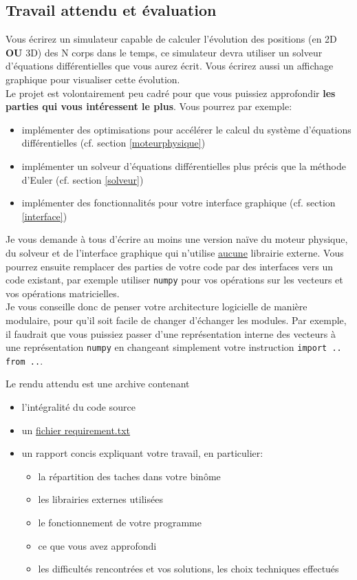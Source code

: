 \documentclass{article}
\begin{document}
\subsection{Travail attendu et évaluation}

Vous écrirez un simulateur capable de calculer l'évolution des positions (en 2D \textbf{OU} 3D) des N corps dans le temps, ce simulateur devra utiliser un solveur d'équations différentielles que vous aurez écrit. Vous écrirez aussi un affichage graphique pour visualiser cette évolution. \\
Le projet est volontairement peu cadré pour que vous puissiez approfondir \textbf{les parties qui vous intéressent le plus}. Vous pourrez par exemple:
\begin{itemize}
    \item implémenter des optimisations pour accélérer le calcul du système d'équations différentielles (cf. section \ref{moteurphysique})
    \item implémenter un solveur d'équations différentielles plus précis que la méthode d'Euler (cf. section \ref{solveur})
    \item implémenter des fonctionnalités pour votre interface graphique (cf. section \ref{interface})
\end{itemize}
Je vous demande à tous d'écrire au moins une version naïve du moteur physique, du solveur et de l'interface graphique qui n'utilise \underline{aucune} librairie externe. Vous pourrez ensuite remplacer des parties de votre code par des interfaces vers un code existant, par exemple utiliser \verb!numpy! pour vos opérations sur les vecteurs et vos opérations matricielles.\\
Je vous conseille donc de penser votre architecture logicielle de manière modulaire, pour qu'il soit facile de changer d'échanger les modules. Par exemple, il faudrait que vous puissiez passer d'une représentation interne des vecteurs à une représentation \verb!numpy! en changeant simplement votre instruction \verb!import .. from ..!.

\vspace{1em}

\noindent Le rendu attendu est une archive contenant
\begin{itemize}
    \item l'intégralité du code source
    \item un \href{https://pip.pypa.io/en/stable/user_guide/#requirements-files}{fichier requirement.txt}
    \item un rapport concis expliquant votre travail, en particulier:
    \begin{itemize}
        \item la répartition des taches dans votre binôme
        \item les librairies externes utilisées
        \item le fonctionnement de votre programme
        \item ce que vous avez approfondi
        \item les difficultés rencontrées et vos solutions, les choix techniques effectués
    \end{itemize}
\end{itemize}
\end{document}
